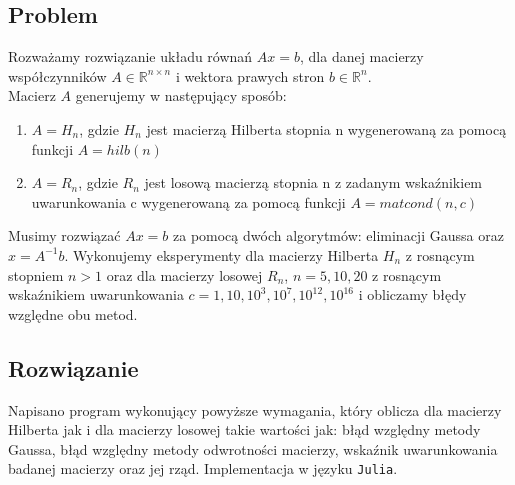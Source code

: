 \documentclass{article}
\begin{document}
        \subsection{Problem}
            Rozważamy rozwiązanie układu równań $Ax = b$, dla danej macierzy współczynników $A \in \mathbb{R}^{n\times n}$ i wektora prawych stron $b\in \mathbb{R}^{n}$. \\
            Macierz $A$ generujemy w następujący sposób:
            \begin{enumerate}
                \item $A = H_n$, gdzie $H_n$ jest macierzą Hilberta stopnia n wygenerowaną za pomocą
funkcji $A=hilb(n)$
                \item $A = R_n$, gdzie $R_n$ jest losową macierzą stopnia n z zadanym wskaźnikiem uwarunkowania
c wygenerowaną za pomocą funkcji $A=matcond(n,c)$
            \end{enumerate}
            Musimy rozwiązać $Ax = b$ za pomocą dwóch algorytmów: eliminacji Gaussa oraz $x = A^{-1}b$.
            Wykonujemy eksperymenty dla macierzy Hilberta $H_n$ z rosnącym stopniem $n > 1$ oraz dla macierzy losowej $R_n$, $n = 5,10,20$ z rosnącym wskaźnikiem uwarunkowania $c = 1,10,10^3,10^7,10^{12},10^{16}$ i obliczamy błędy względne obu metod.
        \subsection{Rozwiązanie}
            Napisano program wykonujący powyższe wymagania, który oblicza dla macierzy Hilberta jak i dla macierzy losowej takie wartości jak: błąd względny metody Gaussa, błąd względny metody odwrotności macierzy, wskaźnik uwarunkowania badanej macierzy oraz jej rząd. Implementacja w języku \texttt{Julia}.
\end{document}
